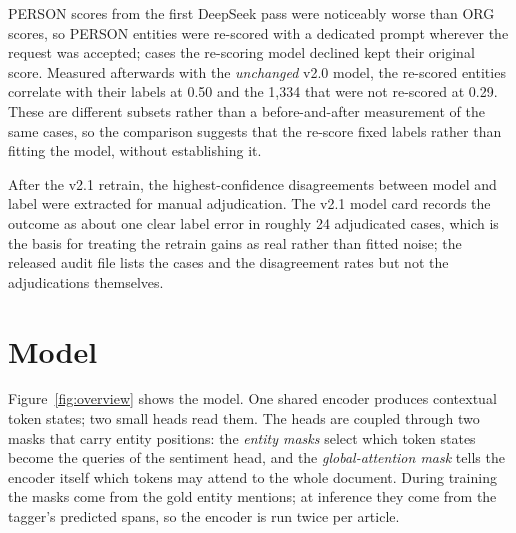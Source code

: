 \documentclass[11pt,letterpaper]{article}
\begin{document}
PERSON scores from the first DeepSeek pass were noticeably worse than ORG scores, so PERSON
entities were re-scored with a dedicated prompt wherever the request was accepted; cases the
re-scoring model declined kept their original score. Measured afterwards with the
\emph{unchanged} v2.0 model, the re-scored entities correlate with their labels at 0.50 and the
1{,}334 that were not re-scored at 0.29. These are different subsets rather than a before-and-after
measurement of the same cases, so the comparison suggests that the re-score fixed labels rather
than fitting the model, without establishing it.

After the v2.1 retrain, the highest-confidence disagreements between model and label were
extracted for manual adjudication. The v2.1 model card records the outcome as about one clear
label error in roughly 24 adjudicated cases, which is the basis for treating the retrain gains
as real rather than fitted noise; the released audit file lists the cases and the disagreement
rates but not the adjudications themselves.

\section{Model}
\label{sec:model}

Figure~\ref{fig:overview} shows the model. One shared encoder produces contextual token states;
two small heads read them. The heads are coupled through two masks that carry entity positions:
the \emph{entity masks} select which token states become the queries of the sentiment head, and
the \emph{global-attention mask} tells the encoder itself which tokens may attend to the whole
document. During training the masks come from the gold entity mentions; at inference they come
from the tagger's predicted spans, so the encoder is run twice per article.
\end{document}
